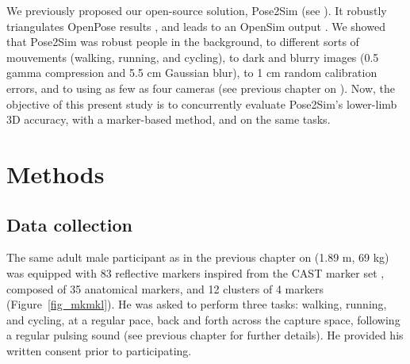 We previously proposed our open-source solution, Pose2Sim (see  \cite{Pagnon2022b}). It robustly triangulates OpenPose results \cite{Cao2019}, and leads to an OpenSim output \cite{Delp2007, Seth2018}. We showed that Pose2Sim was robust people in the background, to different sorts of mouvements (walking, running, and cycling), to dark and blurry images (0.5 gamma compression and 5.5 cm Gaussian blur), to 1 cm random calibration errors, and to using as few as four cameras (see previous chapter on  \cite{Pagnon2021}). Now, the objective of this present study is to concurrently evaluate Pose2Sim’s lower-limb 3D accuracy, with a marker-based method, and on the same tasks.


\section{Methods}\label{sec:accuracy_methods}
\subsection{Data collection}

The same adult male participant as in the previous chapter on  (1.89 m, 69 kg) was equipped with 83 reflective markers inspired from the CAST marker set \cite{Cappozzo1995}, composed of 35 anatomical markers, and 12 clusters of 4 markers (Figure~\ref{fig_mkmkl}). He was asked to perform three tasks: walking, running, and cycling, at a regular pace, back and forth across the capture space, following a regular pulsing sound (see previous chapter for further details). He provided his written consent prior to participating.

